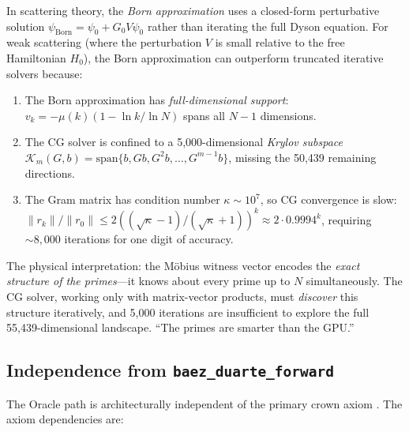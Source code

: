 \begin{correspondence}
\label{corr:krylov}
In scattering theory, the \emph{Born approximation} uses a closed-form
perturbative solution $\psi_{\text{Born}} = \psi_0 + G_0 V \psi_0$
rather than iterating the full Dyson equation. For weak scattering
(where the perturbation $V$ is small relative to the free Hamiltonian
$H_0$), the Born approximation can outperform truncated iterative
solvers because:

\begin{enumerate}
  \item The Born approximation has \emph{full-dimensional support}:
    $v_k = -\mu(k)(1 - \ln k / \ln N)$ spans all $N-1$ dimensions.
  \item The CG solver is confined to a 5{,}000-dimensional
    \emph{Krylov subspace} $\mathcal{K}_m(G, b) =
    \text{span}\{b, Gb, G^2 b, \ldots, G^{m-1} b\}$, missing
    the 50{,}439 remaining directions.
  \item The Gram matrix has condition number $\kappa \sim 10^7$,
    so CG convergence is slow: $\|r_k\|/\|r_0\| \leq
    2((\sqrt{\kappa}-1)/(\sqrt{\kappa}+1))^k \approx 2 \cdot 0.9994^k$,
    requiring $\sim 8{,}000$ iterations for one digit of accuracy.
\end{enumerate}

The physical interpretation: the Möbius witness vector encodes the
\emph{exact structure of the primes}---it knows about every prime up
to $N$ simultaneously. The CG solver, working only with matrix-vector
products, must \emph{discover} this structure iteratively, and 5{,}000
iterations are insufficient to explore the full 55{,}439-dimensional
landscape. ``The primes are smarter than the GPU.''
\end{correspondence}

\subsection{Independence from \texttt{baez\_duarte\_forward}}

The Oracle path is architecturally independent of the primary crown
axiom . The axiom dependencies are:

